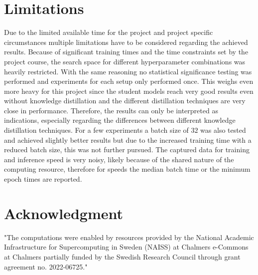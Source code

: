 \documentclass{article}
\begin{document}
\section{Limitations}
Due to the limited available time for the project and project specific circumstances multiple limitations have to be considered regarding the achieved results. Because of significant training times and the time constraints set by the project course, the search space for different hyperparameter combinations was heavily restricted. With the same reasoning no statistical significance testing was performed and experiments for each setup only performed once. This weighs even more heavy for this project since the student models reach very good results even without knowledge distillation and the different distillation techniques are very close in performance. Therefore, the results can only be interpreted as indications, especially regarding the differences between different knowledge distillation techniques.
For a few experiments a batch size of $ 32 $ was also tested and achieved slightly better results but due to the increased training time with a reduced batch size, this was not further pursued.
The captured data for training and inference speed is very noisy, likely because of the shared nature of the computing resource, therefore for speeds the median batch time or the minimum epoch times are reported.

\newpage
\section*{Acknowledgment}
"The computations were enabled by resources provided by the National Academic Infrastructure for Supercomputing in Sweden (NAISS) at Chalmers e-Commons at Chalmers partially funded by the Swedish Research Council through grant agreement no. 2022-06725."



\end{document}
